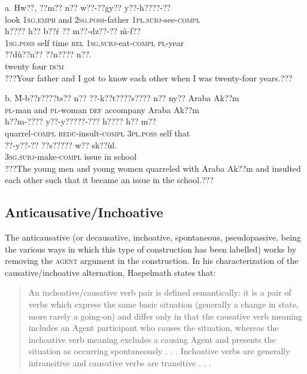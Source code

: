 \documentclass[output=paper]{langsci/langscibook}
\begin{document}
\ea
\gll a.  Hw??,  ??m??     n??   w??-??gy??     y??-h????-??       \\
       look  \textsc{1sg.emph}  and  \textsc{2sg.poss}{}-father  \textsc{1pl.subj}{}-see-\textsc{compl}  \\
\gll   h????    h??   b??\'{r}   ??  m??-dz??-??     \`{m}-f??  \\
       \textsc{1sg.poss}  self  time  \textsc{rel}  \textsc{1sg.subj}{}-eat-\textsc{compl}  \textsc{pl}{}-year\\
\gll   ??d\`{u}??n??   ??n????     n??.     \\
       twenty    four    \textsc{dcm}\\
\glt ???Your father and I got to know each other when I was twenty-four years.??? \citep[9]{Martin1936}
\z

\ea
\gll  b.  \`{M}-b??r????ts??  n??  ??-k??t????s????  n??   ny??     Araba Ak??m  \\
       \textsc{pl}{}-man    and  \textsc{pl}{}-woman  \textsc{def}  accompany  Araba Ak??m\\
\gll   h??m-????      y??-y?????-???    h????    h??  m??\\
       quarrel-\textsc{compl}    \textsc{redu}{}-insult-\textsc{compl}  \textsc{3pl.poss}  self  that\\
\gll   ??{}-y??-??        ??s?????  w??  sk??\`{u}l.\\
       \textsc{3sg.subj}{}-make-\textsc{compl}  issue  in  school\\
\glt ???The young men and young women quarreled with Araba Ak??m and insulted each other such that it became an issue in the school.??? \citep[21]{Martin1936}  
\z

\subsection{Anticausative/Inchoative}

The anticausative (or decausative, inchoative, spontaneous, pseudopassive, being the various ways in which this type of construction has been labelled) works by removing the \textsc{agent} argument in the construction. In his characterization of the causative/inchoative alternation, Haspelmath states that:

\begin{quote}
An inchoative/causative verb pair is defined semantically: it is a pair of verbs which express the same basic situation (generally a change in state, more rarely a going-on) and differ only in that the causative verb meaning includes an Agent participant who causes the situation, whereas the inchoative verb meaning excludes a causing Agent and presents the situation as occurring spontaneously . . . Inchoative verbs are generally intransitive and causative verbs are transitive . . . \citep[90]{Haspelmath1993}
\end{quote}
\end{document}

